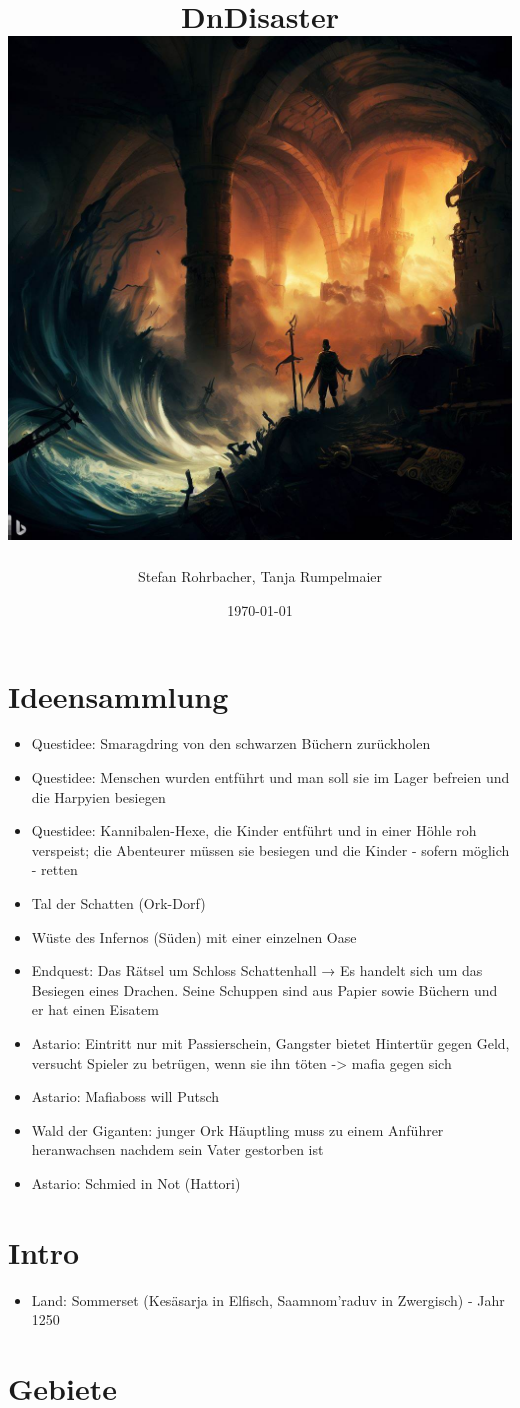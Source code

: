 \documentclass[11pt, twoside]{article}
\author{Stefan Rohrbacher, Tanja Rumpelmaier}
\date{\today}
\title{DnDisaster\\\medskip
\large \includegraphics[width=\linewidth]{wallpaper1.jpeg}}
\begin{document}
\maketitle
\tableofcontents

\newpage

\section{Ideensammlung}
\label{sec:org21e8928}
\begin{itemize}
\item\relax [] Questidee: Smaragdring von den schwarzen Büchern zurückholen
\item\relax [] Questidee: Menschen wurden entführt und man soll sie im Lager befreien und die Harpyien besiegen
\item\relax [] Questidee: Kannibalen-Hexe, die Kinder entführt und in einer Höhle roh verspeist; die Abenteurer müssen sie besiegen und die Kinder - sofern möglich - retten
\item\relax [] Tal der Schatten (Ork-Dorf)
\item\relax [] Wüste des Infernos (Süden) mit einer einzelnen Oase
\item\relax [] Endquest: Das Rätsel um Schloss Schattenhall → Es handelt sich um das Besiegen eines Drachen. Seine Schuppen sind aus Papier sowie Büchern und er hat einen Eisatem
\item Astario: Eintritt nur mit Passierschein, Gangster bietet Hintertür gegen Geld, versucht Spieler zu betrügen, wenn sie ihn töten -> mafia gegen sich
\item Astario: Mafiaboss will Putsch
\item\relax [] Wald der Giganten: junger Ork Häuptling muss zu einem Anführer heranwachsen nachdem sein Vater gestorben ist
\item\relax [] Astario: Schmied in Not (Hattori)
\end{itemize}

\section{Intro}
\label{sec:org057fde1}
\begin{itemize}
\item Land: Sommerset (Kesäsarja in Elfisch, Saamnom’raduv in Zwergisch) - Jahr 1250
\end{itemize}

\section{Gebiete}
\label{sec:org116c76d}
\end{document}
